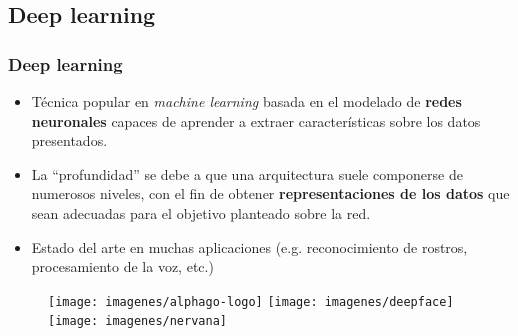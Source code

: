 \subsection{Deep learning}
\watermarkoff
\begin{frame}[t,fragile]
	\frametitle {Deep learning}
	
	\begin{itemize}
		\item Técnica popular en \textit{machine learning} basada en el modelado de \textbf{redes neuronales} capaces de aprender a extraer características sobre los datos presentados.
		
		\item La ``profundidad'' se debe a que una arquitectura suele componerse de numerosos niveles, con el fin de obtener \textbf{representaciones de los datos} que sean adecuadas para el objetivo planteado sobre la red.
		
		\item Estado del arte en muchas aplicaciones (e.g. reconocimiento de rostros, procesamiento de la voz, etc.)
		
	\end{itemize}	
	
	\begin{figure}
		\centering
		\texttt{[image: imagenes/alphago-logo]}
		\qquad
		\texttt{[image: imagenes/deepface]} 
		\qquad
		\texttt{[image: imagenes/nervana]}
	\end{figure}
	
	
	
\end{frame}
\watermarkon

